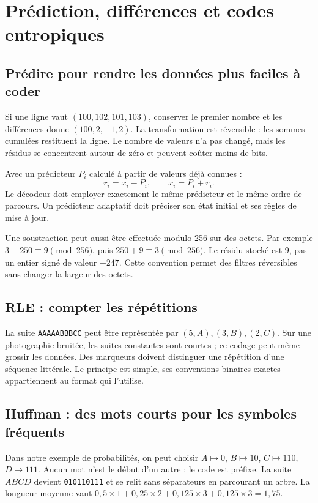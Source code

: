 \section{Prédiction, différences et codes entropiques}
\subsection{Prédire pour rendre les données plus faciles à coder}
Si une ligne vaut $(100,102,101,103)$, conserver le premier nombre
et les différences donne $(100,2,-1,2)$. La transformation est
réversible : les sommes cumulées restituent la ligne.
Le nombre de valeurs n'a pas changé, mais les résidus se
concentrent autour de zéro et peuvent coûter moins de bits.

Avec un prédicteur $P_i$ calculé à partir de valeurs déjà connues :
\begin{equation}
r_i=x_i-P_i,\qquad x_i=P_i+r_i.
\end{equation}
Le décodeur doit employer exactement le même prédicteur et le
même ordre de parcours. Un prédicteur adaptatif doit préciser
son état initial et ses règles de mise à jour.

Une soustraction peut aussi être effectuée modulo 256 sur des
octets. Par exemple $3-250\equiv9\pmod{256}$, puis
$250+9\equiv3\pmod{256}$. Le résidu stocké est 9, pas un entier
signé de valeur $-247$. Cette convention permet des filtres
réversibles sans changer la largeur des octets.

\subsection{RLE : compter les répétitions}
La suite \texttt{AAAAABBBCC} peut être représentée par
$(5,A),(3,B),(2,C)$. Sur une photographie bruitée, les suites
constantes sont courtes ; ce codage peut même grossir les données.
Des marqueurs doivent distinguer une répétition d'une séquence
littérale. Le principe est simple, ses conventions binaires
exactes appartiennent au format qui l'utilise.

\subsection{Huffman : des mots courts pour les symboles fréquents}
Dans notre exemple de probabilités, on peut choisir
$A\mapsto0$, $B\mapsto10$, $C\mapsto110$, $D\mapsto111$.
Aucun mot n'est le début d'un autre : le code est préfixe.
La suite $ABCD$ devient \texttt{010110111} et se relit sans
séparateurs en parcourant un arbre. La longueur moyenne vaut
$0{,}5\times1+0{,}25\times2+0{,}125\times3+0{,}125\times3=1{,}75$.

